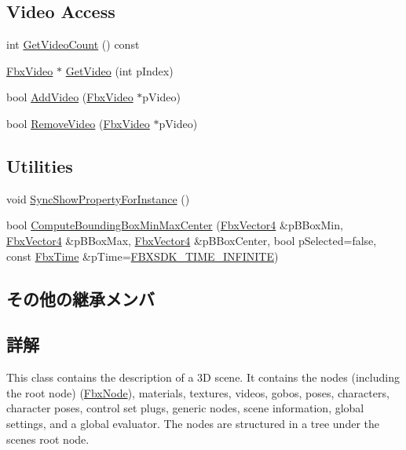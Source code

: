 \subsection*{Video Access}
\begin{DoxyCompactItemize}
\item 
int \hyperlink{class_fbx_scene_a203455f2e5a9b3891cae6eb516e71b15}{Get\+Video\+Count} () const
\item 
\hyperlink{class_fbx_video}{Fbx\+Video} $\ast$ \hyperlink{class_fbx_scene_ae5365932948e9fe88b2323669a92d114}{Get\+Video} (int p\+Index)
\item 
bool \hyperlink{class_fbx_scene_ae71fcbb60eadb1ba418e210d8104cc54}{Add\+Video} (\hyperlink{class_fbx_video}{Fbx\+Video} $\ast$p\+Video)
\item 
bool \hyperlink{class_fbx_scene_aac60d3534072390ae951879dd92339ff}{Remove\+Video} (\hyperlink{class_fbx_video}{Fbx\+Video} $\ast$p\+Video)
\end{DoxyCompactItemize}
\subsection*{Utilities}
\begin{DoxyCompactItemize}
\item 
void \hyperlink{class_fbx_scene_a940444136913f6e50f687ff0807c93e5}{Sync\+Show\+Property\+For\+Instance} ()
\item 
bool \hyperlink{class_fbx_scene_aa7b8cd4fcbb1836fa40f68b55a29cc35}{Compute\+Bounding\+Box\+Min\+Max\+Center} (\hyperlink{class_fbx_vector4}{Fbx\+Vector4} \&p\+B\+Box\+Min, \hyperlink{class_fbx_vector4}{Fbx\+Vector4} \&p\+B\+Box\+Max, \hyperlink{class_fbx_vector4}{Fbx\+Vector4} \&p\+B\+Box\+Center, bool p\+Selected=false, const \hyperlink{class_fbx_time}{Fbx\+Time} \&p\+Time=\hyperlink{fbxtime_8h_a1e6db3fe0f84f0b7daa775739f93526f}{F\+B\+X\+S\+D\+K\+\_\+\+T\+I\+M\+E\+\_\+\+I\+N\+F\+I\+N\+I\+TE})
\end{DoxyCompactItemize}
\subsection*{その他の継承メンバ}


\subsection{詳解}
This class contains the description of a 3D scene. It contains the nodes (including the root node) (\hyperlink{class_fbx_node}{Fbx\+Node}), materials, textures, videos, gobos, poses, characters, character poses, control set plugs, generic nodes, scene information, global settings, and a global evaluator. The nodes are structured in a tree under the scene\textquotesingle{}s root node.


